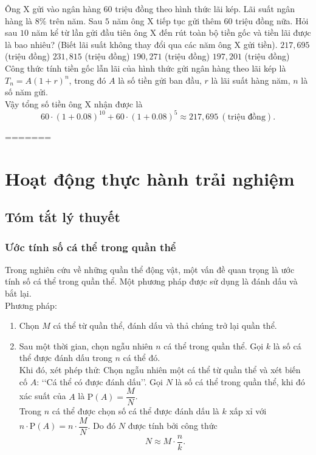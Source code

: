 \begin{ex}%
Ông X gửi vào ngân hàng $60$ triệu đồng theo hình thức lãi kép. Lãi suất ngân hàng là  $8\%$ trên năm. Sau $5$ năm ông X tiếp tục gửi thêm $60$ triệu đồng nữa. Hỏi sau $10$ năm kể từ lần gửi đầu tiên ông X đến rút toàn bộ tiền gốc và tiền lãi được là bao nhiêu? (Biết lãi suất không thay đổi qua các năm ông X gửi tiền).
\choice
{\True $217{,}695$ (triệu đồng)}
{$231{,}815$ (triệu đồng)}
{$190{,}271$ (triệu đồng)}
{$197{,}201$ (triệu đồng)}
\loigiai
{Công thức tính tiền gốc lẫn lãi của hình thức gửi ngân hàng theo lãi kép là $T_n=A(1+r)^n$, trong đó $A$ là số tiền gửi ban đầu, $r$ là lãi suất hàng năm, $n$ là số năm gửi.\\
Vậy tổng số tiền ông X nhận được là $$60\cdot (1+0.08)^{10}+60\cdot (1+0.08)^5\approx 217{,}695\ (\text{triệu đồng}).$$
}
\end{ex}

=======
\section{Hoạt động thực hành trải nghiệm}
\subsection{Tóm tắt lý thuyết}
\subsubsection{Ước tính số cá thể trong quần thể}
Trong nghiên cứu về những quần thể động vật, một vấn đề quan trọng là ước tính số cá thể trong quần thể. Một phương pháp được sử dụng là đánh dấu và bắt lại.\\
Phương pháp: 
\begin{enumerate}
	\item Chọn $M$ cá thể từ quần thể, đánh dấu và thả chúng trở lại quần thể.
	\item Sau một thời gian, chọn ngẫu nhiên $n$ cá thể trong quần thể. Gọi $k$ là số cá thể được đánh dấu trong $n$ cá thể đó.\\
	Khi đó, xét phép thử: Chọn ngẫu nhiên một cá thể từ quần thể và xét biến cố $A$: \lq\lq  Cá thể có được đánh dấu\rq\rq. Gọi $N$ là số cá thể trong quần thể, khi đó xác suất của $A$ là $\mathrm{P}(A)=\dfrac{M}{N}$.\\
	Trong $n$ cá thể được chọn số cá thể được đánh dấu là $k$ xấp xỉ với $n\cdot \mathrm{P}(A)=n\cdot \dfrac{M}{N}$. Do đó $N$ được tính bởi công thức 
	\[N\approx M\cdot \dfrac{n}{k}.\]
\end{enumerate}
